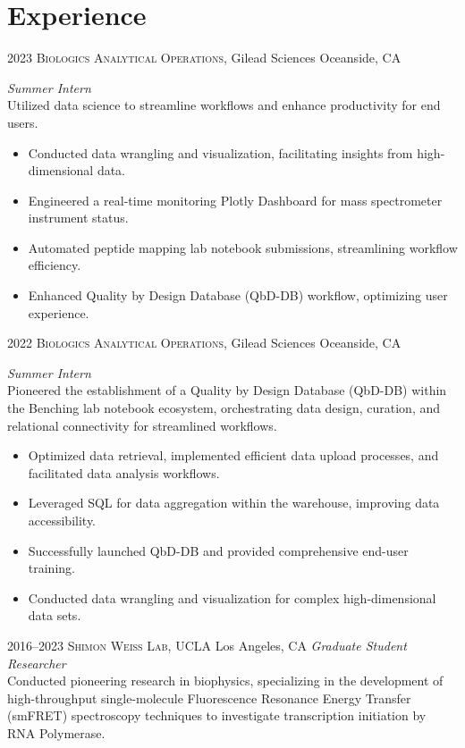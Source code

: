\section{Experience}

\begin{entrylist}
\entry
{2023}
{\textsc{Biologics Analytical Operations}, Gilead Sciences}
{Oceanside, CA}
{\emph{Summer Intern} \\
Utilized data science to streamline workflows and enhance productivity for end users.
\begin{itemize}
\item Conducted data wrangling and visualization, facilitating insights from high-dimensional data.
\item Engineered a real-time monitoring Plotly Dashboard for mass spectrometer instrument status.
\item Automated peptide mapping lab notebook submissions, streamlining workflow efficiency.
\item Enhanced Quality by Design Database (QbD-DB) workflow, optimizing user experience.
\end{itemize}}
\entry
{2022}
{\textsc{Biologics Analytical Operations}, Gilead Sciences}
{Oceanside, CA}
{\emph{Summer Intern} \\
 Pioneered the establishment of a Quality by Design Database (QbD-DB) within the Benching lab notebook ecosystem, orchestrating data design, curation, and relational connectivity for streamlined workflows. 
\begin{itemize}
\item Optimized data retrieval, implemented efficient data upload processes, and facilitated data analysis workflows. 
\item Leveraged SQL for data aggregation within the warehouse, improving data accessibility. 
\item Successfully launched QbD-DB and provided comprehensive end-user training. 
\item Conducted data wrangling and visualization for complex high-dimensional data sets.
\end{itemize}}
\entry
{2016--2023}
{\textsc{Shimon Weiss Lab}, UCLA}
{Los Angeles, CA}
{\emph{Graduate Student Researcher}\\
Conducted pioneering research in biophysics, specializing in the development of high-throughput single-molecule Fluorescence Resonance Energy Transfer (smFRET) spectroscopy techniques to investigate transcription initiation by RNA Polymerase.
}
\end{entrylist}
